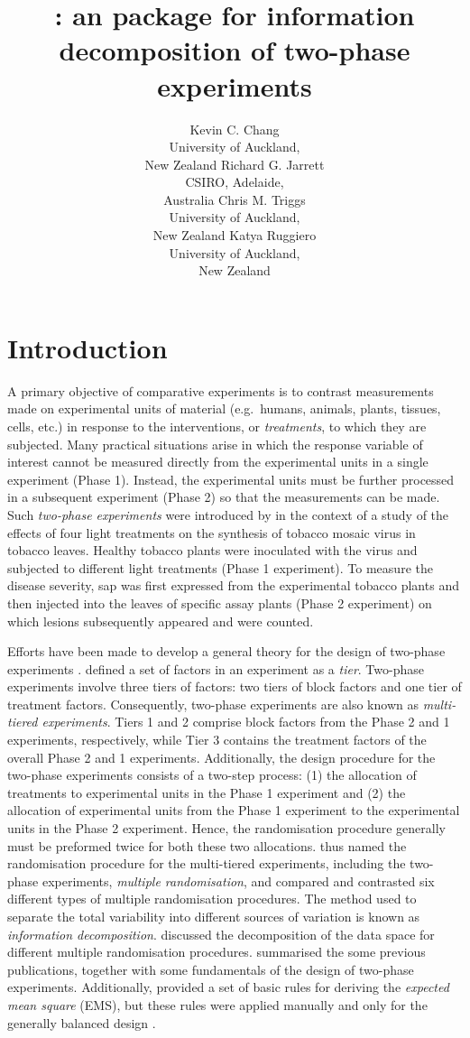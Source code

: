 \documentclass[article]{jss}
\author{Kevin C. Chang\\University of Auckland,\\ New Zealand \And
        Richard G. Jarrett\\CSIRO, Adelaide,\\ Australia \And
        Chris M. Triggs\\University of Auckland,\\ New Zealand \And
        Katya Ruggiero\\University of Auckland,\\ New Zealand }
\title{\pkg{InfoDecompuTE}: an \proglang{R} package for information decomposition of two-phase experiments }
\begin{document}
\section[Introduction]{Introduction}
A primary objective of comparative experiments is to contrast measurements made on experimental units of material (e.g.\ humans, animals, plants, tissues, cells, etc.) in response to the interventions, or \emph{treatments}, to which they are subjected. Many practical situations arise in which the response variable of interest cannot be measured directly from the experimental units in a single experiment (Phase 1). Instead, the experimental units must be further processed in a subsequent experiment (Phase 2) so that the measurements can be made. Such \emph{two-phase experiments} were introduced by \cite{McIntyre1955} in the context of a study of the effects of four light treatments on the synthesis of tobacco mosaic virus in tobacco leaves. Healthy tobacco plants were inoculated with the virus and subjected to different light treatments (Phase 1 experiment). To measure the disease severity, sap was first expressed from the experimental tobacco plants and then injected into the leaves of specific assay plants (Phase 2 experiment) on which lesions subsequently appeared and were counted. 

Efforts have been made to develop a general theory for the design of two-phase experiments \citep{Brien1983, Wood1988, Brien1999, Jarrett2008}. \cite{Brien1983} defined a set of factors in an experiment as a \emph{tier}. Two-phase experiments involve three tiers of factors: two tiers of block factors and one tier of treatment factors. Consequently, two-phase experiments are also known as \emph{multi-tiered experiments}. Tiers 1 and 2 comprise block factors from the Phase 2 and 1 experiments, respectively, while Tier 3 contains the treatment factors of the overall Phase 2 and 1 experiments. Additionally, the design procedure for the two-phase experiments consists of a two-step process: (1) the allocation of treatments to experimental units in the Phase 1 experiment and (2) the allocation of experimental units from the Phase 1 experiment to the experimental units in the Phase 2 experiment. Hence, the randomisation procedure generally must be preformed twice for both these two allocations. \cite{Brien2006b} thus named the randomisation procedure for the multi-tiered experiments, including the two-phase experiments, \emph{multiple randomisation}, and compared and contrasted six different types of multiple randomisation procedures. The method used to separate the total variability into different sources of variation is known as \emph{information decomposition}. \cite{Brien2009, Brien2010} discussed the decomposition of the data space for different multiple randomisation procedures. \cite{Brien2011} summarised the some previous publications, together with some fundamentals of the design of two-phase experiments. Additionally, \cite{Brien2011} provided a set of basic rules for deriving the \emph{expected mean square} (EMS), but these rules were applied manually and only for the generally balanced design \citep{Payne2003}.  
\end{document}
